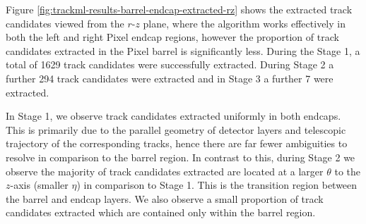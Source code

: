 Figure \ref{fig:trackml-results-barrel-endcap-extracted-rz} shows the extracted track candidates viewed from the $r$-$z$ plane, where the algorithm works effectively in both the left and right Pixel endcap regions, however the proportion of track candidates extracted in the Pixel barrel is significantly less. During the Stage 1, a total of 1629 track candidates were successfully extracted. During Stage 2 a further 294 track candidates were extracted and in Stage 3 a further 7 were extracted.

In Stage 1, we observe track candidates extracted uniformly in both endcaps. This is primarily due to the parallel geometry of detector layers and telescopic trajectory of the corresponding tracks, hence there are far fewer ambiguities to resolve in comparison to the barrel region. In contrast to this, during Stage 2 we observe the majority of track candidates extracted are located at a larger $\theta$ to the $z$-axis (smaller $\eta$) in comparison to Stage 1. This is the transition region between the barrel and endcap layers. We also observe a small proportion of track candidates extracted which are contained only within the barrel region.


